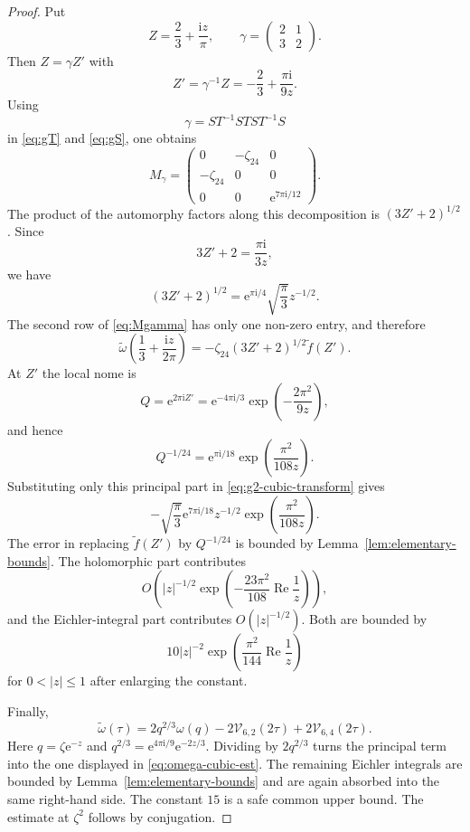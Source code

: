\documentclass[11pt]{article}
\theoremstyle{remark}
\newcommand{\ii}{\mathrm i}
\newcommand{\e}{\mathrm e}
\newcommand{\Repart}{\operatorname{Re}}
\begin{document}
\begin{proof}
Put
\[
Z=\frac23+\frac{\ii z}{\pi},
\qquad
\gamma=\begin{pmatrix}2&1\\3&2\end{pmatrix}.
\]
Then $Z=\gamma Z'$ with
\[
Z'=\gamma^{-1}Z=-\frac23+\frac{\pi\ii}{9z}.
\]
Using
\[
\gamma=ST^{-1}STS T^{-1}S
\]
in \eqref{eq:gT} and \eqref{eq:gS}, one obtains
\begin{equation}\label{eq:Mgamma}
M_\gamma=
\begin{pmatrix}
0&-\zeta_{24}&0\\
-\zeta_{24}&0&0\\
0&0&\e^{7\pi\ii/12}
\end{pmatrix}.
\end{equation}
The product of the automorphy factors along this decomposition is
$(3Z'+2)^{1/2}$.  Since
\[
3Z'+2=\frac{\pi\ii}{3z},
\]
we have
\[
(3Z'+2)^{1/2}=\e^{\pi\ii/4}\sqrt{\frac{\pi}{3}}z^{-1/2}.
\]
The second row of \eqref{eq:Mgamma} has only one non-zero entry, and therefore
\begin{equation}\label{eq:g2-cubic-transform}
\widetilde\omega\left(\frac13+\frac{\ii z}{2\pi}\right)
= -\zeta_{24}(3Z'+2)^{1/2}\widetilde f(Z').
\end{equation}
At $Z'$ the local nome is
\[
Q=\e^{2\pi\ii Z'}
=\e^{-4\pi\ii/3}\exp\left(-\frac{2\pi^2}{9z}\right),
\]
and hence
\[
Q^{-1/24}
=
\e^{\pi\ii/18}\exp\left(\frac{\pi^2}{108z}\right).
\]
Substituting only this principal part in \eqref{eq:g2-cubic-transform} gives
\[
-\sqrt{\frac{\pi}{3}}\e^{7\pi\ii/18}z^{-1/2}
\exp\left(\frac{\pi^2}{108z}\right).
\]
The error in replacing $\widetilde f(Z')$ by $Q^{-1/24}$ is bounded by
Lemma~\ref{lem:elementary-bounds}.  The holomorphic part contributes
\[
O\left(|z|^{-1/2}
\exp\left(-\frac{23\pi^2}{108}\Repart\frac1z\right)
\right),
\]
and the Eichler-integral part contributes $O(|z|^{-1/2})$.  Both are bounded by
\[
10 |z|^{-2}\exp\left(\frac{\pi^2}{144}\Repart\frac1z\right)
\]
for $0<|z|\leq1$ after enlarging the constant.

Finally,
\[
\widetilde\omega(\tau)
=2q^{2/3}\omega(q)-2\mathcal V_{6,2}(2\tau)+2\mathcal V_{6,4}(2\tau).
\]
Here $q=\zeta\e^{-z}$ and
$q^{2/3}=\e^{4\pi\ii/9}\e^{-2z/3}$.  Dividing by $2q^{2/3}$ turns the principal
term into the one displayed in \eqref{eq:omega-cubic-est}.  The remaining
Eichler integrals are bounded by Lemma~\ref{lem:elementary-bounds} and are again
absorbed into the same right-hand side.  The constant $15$ is a safe common
upper bound.  The estimate at $\zeta^2$ follows by conjugation.
\end{proof}
\end{document}
